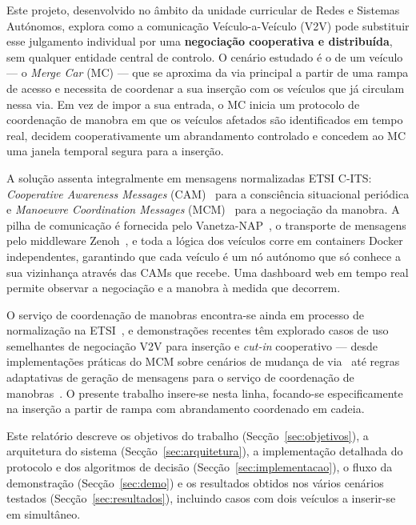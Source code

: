 \documentclass[11pt,a4paper]{article}
\begin{document}
Este projeto, desenvolvido no âmbito da unidade curricular de Redes e Sistemas
Autónomos, explora como a comunicação Veículo-a-Veículo (V2V) pode substituir esse
julgamento individual por uma \textbf{negociação cooperativa e distribuída}, sem
qualquer entidade central de controlo. O cenário estudado é o de um veículo --- o
\emph{Merge Car} (MC) --- que se aproxima da via principal a partir de uma rampa de
acesso e necessita de coordenar a sua inserção com os veículos que já circulam nessa
via. Em vez de impor a sua entrada, o MC inicia um protocolo de coordenação de manobra
em que os veículos afetados são identificados em tempo real, decidem cooperativamente
um abrandamento controlado e concedem ao MC uma janela temporal segura para a inserção.

A solução assenta integralmente em mensagens normalizadas ETSI C-ITS:
\emph{Cooperative Awareness Messages} (CAM)~\cite{etsi-cam} para a consciência
situacional periódica e \emph{Manoeuvre Coordination Messages} (MCM)~\cite{etsi-mcm}
para a negociação da manobra. A pilha de comunicação é fornecida pelo
Vanetza-NAP~\cite{vanetza-nap}, o transporte de mensagens pelo middleware
Zenoh~\cite{zenoh}, e toda a lógica dos veículos corre em containers
Docker~\cite{docker} independentes, garantindo que cada veículo é um nó autónomo que só
conhece a sua vizinhança através das CAMs que recebe. Uma dashboard web em tempo real
permite observar a negociação e a manobra à medida que decorrem.

O serviço de coordenação de manobras encontra-se ainda em processo de normalização na
ETSI~\cite{etsi-mcm,etsi-mcm-tr}, e demonstrações recentes têm explorado casos de uso
semelhantes de negociação V2V para inserção e \emph{cut-in} cooperativo --- desde
implementações práticas do MCM sobre cenários de mudança de via~\cite{ccam-cutin} até
regras adaptativas de geração de mensagens para o serviço de coordenação de
manobras~\cite{ieee-mcs-rules}. O presente trabalho insere-se nesta linha, focando-se
especificamente na inserção a partir de rampa com abrandamento coordenado em cadeia.

Este relatório descreve os objetivos do trabalho (Secção~\ref{sec:objetivos}), a
arquitetura do sistema (Secção~\ref{sec:arquitetura}), a implementação detalhada do
protocolo e dos algoritmos de decisão (Secção~\ref{sec:implementacao}), o fluxo da
demonstração (Secção~\ref{sec:demo}) e os resultados obtidos nos vários cenários
testados (Secção~\ref{sec:resultados}), incluindo casos com dois veículos a inserir-se
em simultâneo.
\end{document}

